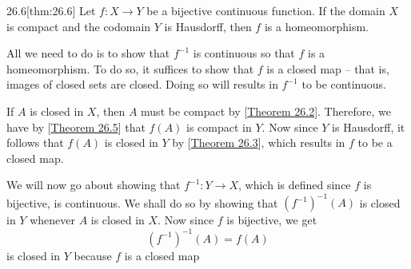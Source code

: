 \begin{thmBox}{26.6}[thm:26.6]
    Let \( f: X \rightarrow Y \) be a bijective continuous function.
    If the domain \( X \) is compact and the codomain \( Y \) is Hausdorff, 
    then \( f \) is a homeomorphism.

    \baseRule

    \begin{proofBox}
        All we need to do is to show that \( f^{ -1 } \) is continuous so that
        \( f \) is a homeomorphism.
        To do so, it suffices to show that \( f \) is a closed map -- that is,
        images of closed sets are closed.
        Doing so will results in \( f^{ -1 } \) to be continuous.

        \baseSkip

        If \( A \) is closed in \( X \), then \( A \) must be compact by 
        [\hyperlink{thm:26.2}{Theorem 26.2}]. 
        Therefore, we have by [\hyperlink{thm:26.5}{Theorem 26.5}] that 
        \( f ( A ) \) is compact in \( Y \).
        Now since \( Y \) is Hausdorff, it follows that \( f ( A ) \) is 
        closed in \( Y \) by [\hyperlink{thm:26.3}{Theorem 26.3}], which results
        in \( f \) to be a closed map.

        \baseSkip

        We will now go about showing that \( f^{ -1 }: Y \rightarrow X \),
        which is defined since \( f \) is bijective, is continuous.
        We shall do so by showing that \( ( f^{ -1 } )^{ -1 } ( A ) \) is 
        closed in \( Y \) whenever \( A \) is closed in \( X \).
        Now since \( f \) is bijective, we get
        \begin{equation*}
            ( f^{ -1 } )^{ -1 } ( A )
            =
            f ( A )
        \end{equation*}
        is closed in \( Y \) because \( f \) is a closed map
    \end{proofBox}
\end{thmBox}

